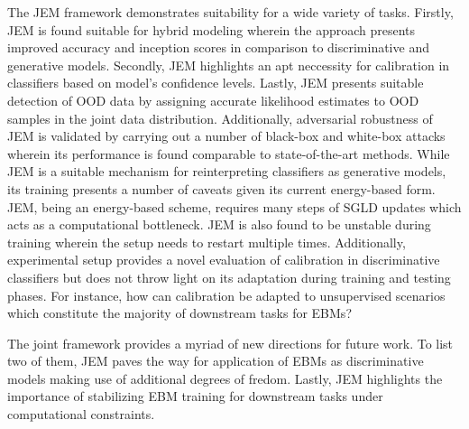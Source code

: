 \documentclass[11pt,letterpaper]{article}
\begin{document}
The JEM framework demonstrates suitability for a wide variety of tasks. Firstly, JEM is found suitable for hybrid modeling wherein the approach presents improved accuracy and inception scores in comparison to discriminative and generative models. Secondly, JEM highlights an apt neccessity for calibration in classifiers based on model's confidence levels. Lastly, JEM presents suitable detection of OOD data by assigning accurate likelihood estimates to OOD samples in the joint data distribution. Additionally, adversarial robustness of JEM is validated by carrying out a number of black-box and white-box attacks wherein its performance is found comparable to state-of-the-art methods. While JEM is a suitable mechanism for reinterpreting classifiers as generative models, its training presents a number of caveats given its current energy-based form. JEM, being an energy-based scheme, requires many steps of SGLD updates which acts as a computational bottleneck. JEM is also found to be unstable during training wherein the setup needs to restart multiple times. Additionally, experimental setup provides a novel evaluation of calibration in discriminative classifiers but does not throw light on its adaptation during training and testing phases. For instance, how can calibration be adapted to unsupervised scenarios which constitute the majority of downstream tasks for EBMs? 

The joint framework provides a myriad of new directions for future work. To list two of them, JEM paves the way for application of EBMs as discriminative models making use of additional degrees of fredom. Lastly, JEM highlights the importance of stabilizing EBM training for downstream tasks under computational constraints. 
\end{document}
